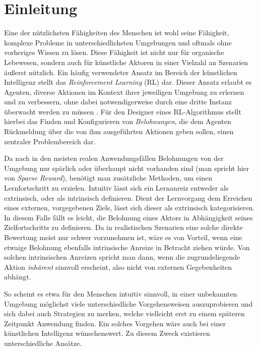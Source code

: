 \section{Einleitung}
\label{sec:intro}
Eine der nützlichsten Fähigkeiten des Menschen ist wohl seine Fähigkeit, komplexe Probleme in unterschiedlichsten Umgebungen und oftmals ohne vorheriges Wissen zu lösen.
Diese Fähigkeit ist nicht nur für organische Lebewesen, sondern auch für künstliche Aktoren in einer Vielzahl an Szenarien äußerst nützlich.
Ein häufig verwendeter Ansatz im Bereich der künstlichen Intelligenz stellt das \textit{Reinforcement Learning} (RL) dar. Dieser Ansatz erlaubt es Agenten, diverse Aktionen im Kontext ihrer jeweiligen Umgebung zu erlernen und zu verbessern, ohne dabei notwendigerweise durch eine dritte Instanz überwacht werden zu müssen \cite{reinforcement_learning_kaelbling}. 
Für den Designer eines RL-Algorithmus stellt hierbei das Finden und Konfigurieren von \textit{Belohnungen}, die dem Agenten Rückmeldung über die von ihm ausgeführten Aktionen geben sollen, einen zentraler Problembereich dar.

Da nach \cite{reachability_savinov} in den meisten realen Anwendungsfällen Belohnungen von der Umgebung nur spärlich oder überhaupt nicht vorhanden sind (man spricht hier von \textit{Sparse Reward}), benötigt man zusätzliche Methoden, um einen Lernfortschritt zu erzielen.
Intuitiv lässt sich ein Lernanreiz entweder als extrinsisch, oder als intrinsisch definieren. Dient der Lernvorgang dem Erreichen eines externen, vorgegebenen Ziels, lässt sich dieser als extrinsisch kategorisieren. In diesem Falle fällt es leicht, die Belohnung eines Aktors in Abhängigkeit seines Zielfortschritts zu definieren. 
Da in realistischen Szenarien eine solche direkte Bewertung meist nur schwer vorzunehmen ist, wäre es von Vorteil, wenn eine etwaige Belohnung ebenfalls intrinsische Anreize in Betracht ziehen würde. Von solchen intrinsischen Anreizen spricht man dann, wenn die zugrundeliegende Aktion \textit{inhärent} sinnvoll erscheint, also nicht von  externen Gegebenheiten abhängt.

So scheint es etwa für den Menschen intuitiv sinnvoll, in einer unbekannten Umgebung möglichst viele unterschiedliche Vorgehensweisen auszuprobieren und sich dabei auch Strategien zu merken, welche vielleicht erst zu einem späteren Zeitpunkt Anwendung finden. Ein solches Vorgehen wäre auch bei einer künstlichen Intelligenz wünschenswert. Zu diesem Zweck existieren unterschiedliche Ansätze.

